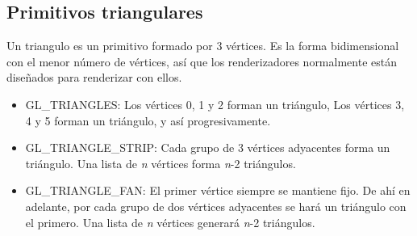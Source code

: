 \newpage


\subsection{Primitivos triangulares}
Un triangulo es un primitivo formado por 3 vértices. Es la forma bidimensional con el menor número de vértices, así que los renderizadores normalmente están diseñados para renderizar con ellos.
\begin{itemize}
\item{GL\_TRIANGLES: Los vértices 0, 1 y 2 forman un triángulo, Los vértices 3, 4 y 5 forman un triángulo, y así progresivamente.}
\item{GL\_TRIANGLE\_STRIP: Cada grupo de 3 vértices adyacentes forma un triángulo. Una lista de \textit{n} vértices forma \textit{n}-2 triángulos.}
\item{GL\_TRIANGLE\_FAN: El primer vértice siempre se mantiene fijo. De ahí en adelante, por cada grupo de dos vértices adyacentes se hará un triángulo con el primero. Una lista de \textit{n} vértices generará \textit{n}-2 triángulos.}
\end{itemize}

